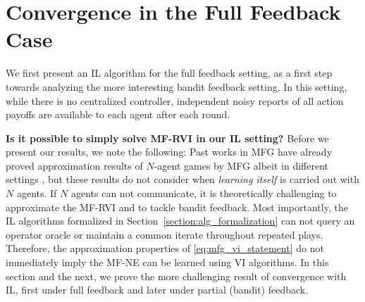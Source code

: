 \section{Convergence in the Full Feedback Case}\label{sec:expert_feedback_results}

We first present an IL algorithm for the full feedback setting, as a first step towards analyzing the more interesting bandit feedback setting.
In this setting, while there is no centralized controller, independent noisy reports of all action payoffs are available to each agent after each round.

\textbf{Is it possible to simply solve MF-RVI in our IL setting?}
Before we present our results, we note the following:
Past works in MFG have already proved approximation results of $N$-agent games by MFG albeit in different settings \citep{saldi2019approximate, yardim2024mean}, but these results do not consider when \emph{learning itself} is carried out with $N$ agents. 
If $N$ agents can not communicate, it is theoretically challenging to approximate the MF-RVI and to tackle bandit feedback.
Most importantly, the IL algorithms formalized in Section~\ref{section:alg_formalization} can not query an operator oracle or maintain a common iterate throughout repeated plays.
Therefore, the approximation properties of \eqref{eq:mfg_vi_statement} do not immediately imply the MF-NE can be learned using VI algorithms.
In this section and the next, we prove the more challenging result of convergence with IL, first under full feedback and later under partial (bandit) feedback.

